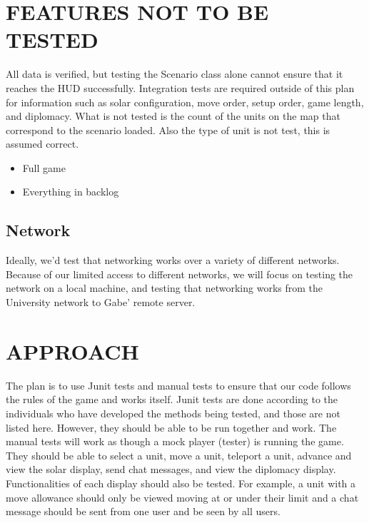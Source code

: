 \section[FEATURES NOT TO BE TESTED]{\bfseries\color{black}
	 FEATURES NOT TO BE TESTED}
{\color{black}
All data is verified, but testing the Scenario class alone cannot ensure 
that it reaches the HUD successfully. Integration tests are required outside 
of this plan for information such as solar configuration, move order, setup order, 
game length, and diplomacy.
\newline
\newline
What is not tested is the count of the units on the map that correspond to the scenario loaded. Also the type of unit is not test, this is assumed correct. 
\begin{itemize}
\item Full game
\item Everything in backlog
\end{itemize}


\subsection{Network}
Ideally, we'd test that networking works over a variety of different
networks. Because of our limited access to different networks, we will
focus on testing the network on a local machine, and testing that
networking works from the University network to Gabe' remote server.

}

\section[APPROACH]{\bfseries\color{black} APPROACH}
{\color{black}
The plan is to use Junit tests and manual tests to ensure that our code follows the rules of the game and works itself. Junit tests are done according to the individuals who have developed the methods being tested, and those are not listed here. However, they should be able to be run together and work. The manual tests will work as though a mock player (tester) is running the game. They should be able to select a unit, move a unit, teleport a unit, advance and view the solar display, send chat messages, and view the diplomacy display. Functionalities of each display should also be tested. For example, a unit with a move allowance should only be viewed moving at or under their limit and a chat message should be sent from one user and be seen by all users.
}

